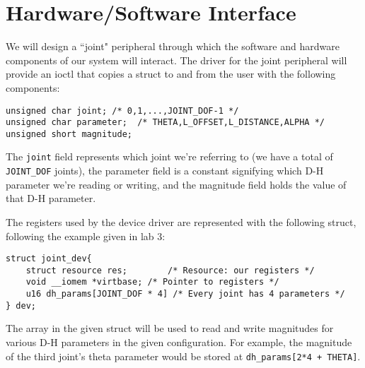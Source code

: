 \section{Hardware/Software Interface}

We will design a ``joint" peripheral through which the software and hardware components of our system will interact. 
The driver for the joint peripheral will provide an ioctl that copies a struct to and from the user with the following components:
\begin{verbatim}
unsigned char joint; /* 0,1,...,JOINT_DOF-1 */
unsigned char parameter;  /* THETA,L_OFFSET,L_DISTANCE,ALPHA */ 
unsigned short magnitude; 
\end{verbatim}
The \texttt{joint} field represents which joint we're referring to (we have a total of \texttt{JOINT\_DOF} joints), the parameter field
is a constant signifying which D-H parameter we're reading or writing, and the magnitude field holds the value of that D-H parameter.

The registers used by the device driver are represented with the following struct, following the example given in lab 3:

\begin{verbatim}
struct joint_dev{
	struct resource res;		/* Resource: our registers */
	void __iomem *virtbase; /* Pointer to registers */
	u16 dh_params[JOINT_DOF * 4] /* Every joint has 4 parameters */
} dev;
\end{verbatim}

The array in the given struct will be used to read and write magnitudes for various D-H parameters in the given configuration. For example,
the magnitude of the third joint's theta parameter would be stored at \texttt{dh\_params[2*4 + THETA]}.

